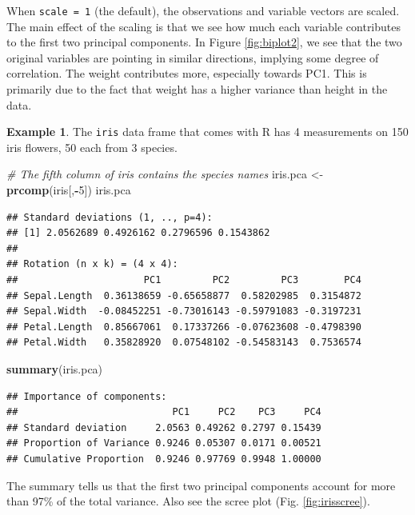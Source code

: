 \documentclass[
]{book}
\newenvironment{Shaded}{\begin{snugshade}}{\end{snugshade}}
\newcommand{\CommentTok}[1]{\textcolor[rgb]{0.56,0.35,0.01}{\textit{#1}}}
\newcommand{\DecValTok}[1]{\textcolor[rgb]{0.00,0.00,0.81}{#1}}
\newcommand{\FunctionTok}[1]{\textcolor[rgb]{0.13,0.29,0.53}{\textbf{#1}}}
\newcommand{\NormalTok}[1]{#1}
\newcommand{\OtherTok}[1]{\textcolor[rgb]{0.56,0.35,0.01}{#1}}
\newcommand{\SpecialCharTok}[1]{\textcolor[rgb]{0.81,0.36,0.00}{\textbf{#1}}}
\theoremstyle{definition}
\theoremstyle{definition}
\newtheorem{example}{Example}[chapter]
\theoremstyle{definition}
\theoremstyle{definition}
\theoremstyle{remark}
\begin{document}
When \texttt{scale\ =\ 1} (the default), the observations and variable vectors are scaled. The main effect of the scaling is that we see how much each variable contributes to the first two principal components. In Figure \ref{fig:biplot2}, we see that the two original variables are pointing in similar directions, implying some degree of correlation. The weight contributes more, especially towards PC1. This is primarily due to the fact that weight has a higher variance than height in the data.

\begin{examplebox}

\begin{example}
The \texttt{iris} data frame that comes with R has 4 measurements on 150 iris flowers, 50 each from 3 species.

\begin{Shaded}
\begin{Highlighting}[]
\CommentTok{\# The fifth column of iris contains the species names}
\NormalTok{iris.pca }\OtherTok{\textless{}{-}} \FunctionTok{prcomp}\NormalTok{(iris[,}\SpecialCharTok{{-}}\DecValTok{5}\NormalTok{])}
\NormalTok{iris.pca}
\end{Highlighting}
\end{Shaded}

\begin{verbatim}
## Standard deviations (1, .., p=4):
## [1] 2.0562689 0.4926162 0.2796596 0.1543862
## 
## Rotation (n x k) = (4 x 4):
##                      PC1         PC2         PC3        PC4
## Sepal.Length  0.36138659 -0.65658877  0.58202985  0.3154872
## Sepal.Width  -0.08452251 -0.73016143 -0.59791083 -0.3197231
## Petal.Length  0.85667061  0.17337266 -0.07623608 -0.4798390
## Petal.Width   0.35828920  0.07548102 -0.54583143  0.7536574
\end{verbatim}

\begin{Shaded}
\begin{Highlighting}[]
\FunctionTok{summary}\NormalTok{(iris.pca)}
\end{Highlighting}
\end{Shaded}

\begin{verbatim}
## Importance of components:
##                           PC1     PC2    PC3     PC4
## Standard deviation     2.0563 0.49262 0.2797 0.15439
## Proportion of Variance 0.9246 0.05307 0.0171 0.00521
## Cumulative Proportion  0.9246 0.97769 0.9948 1.00000
\end{verbatim}

The summary tells us that the first two principal components account for more than 97\% of the total variance. Also see the scree plot (Fig. \ref{fig:irisscree}).
\end{example}

\end{examplebox}
\end{document}
